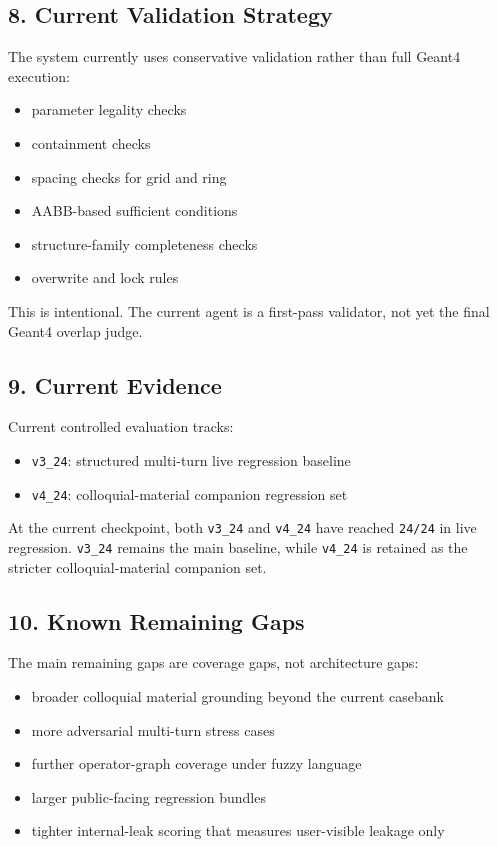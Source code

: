 \documentclass[11pt,a4paper]{ctexart}
\begin{document}
\subsection*{8. Current Validation Strategy}
The system currently uses conservative validation rather than full Geant4 execution:
\begin{itemize}
\item parameter legality checks
\item containment checks
\item spacing checks for grid and ring
\item AABB-based sufficient conditions
\item structure-family completeness checks
\item overwrite and lock rules
\end{itemize}
This is intentional. The current agent is a first-pass validator, not yet the final Geant4 overlap judge.
\subsection*{9. Current Evidence}
Current controlled evaluation tracks:
\begin{itemize}
\item \texttt{v3\_24}: structured multi-turn live regression baseline
\item \texttt{v4\_24}: colloquial-material companion regression set
\end{itemize}
At the current checkpoint, both \texttt{v3\_24} and \texttt{v4\_24} have reached \texttt{24/24} in live regression. \texttt{v3\_24} remains the main baseline, while \texttt{v4\_24} is retained as the stricter colloquial-material companion set.
\subsection*{10. Known Remaining Gaps}
The main remaining gaps are coverage gaps, not architecture gaps:
\begin{itemize}
\item broader colloquial material grounding beyond the current casebank
\item more adversarial multi-turn stress cases
\item further operator-graph coverage under fuzzy language
\item larger public-facing regression bundles
\item tighter internal-leak scoring that measures user-visible leakage only
\end{itemize}
\end{document}

